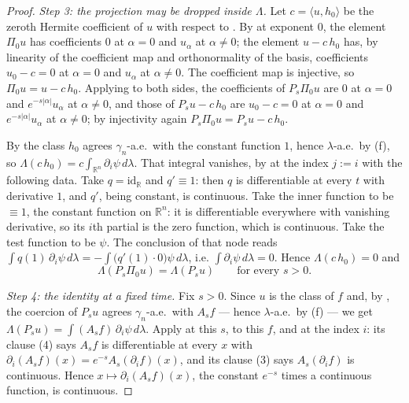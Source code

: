\begin{proof}
\emph{Step 3: the projection may be dropped inside $\Lambda$.}
Let $c = \langle u, h_0\rangle$ be the zeroth Hermite coefficient of $u$ with
respect to .  By  at exponent $0$, the
element $\Pi_0u$ has coefficients $0$ at $\alpha = 0$ and $u_\alpha$ at
$\alpha \neq 0$; the element $u - c\,h_0$ has, by linearity of the coefficient
map and orthonormality of the basis, coefficients $u_0 - c = 0$ at $\alpha = 0$
and $u_\alpha$ at $\alpha \neq 0$.  The coefficient map is injective, so
$\Pi_0 u = u - c\,h_0$.  Applying  to both sides,
the coefficients of $P_s\Pi_0u$ are $0$ at $\alpha = 0$ and
$e^{-s|\alpha|}u_\alpha$ at $\alpha \neq 0$, and those of $P_su - c\,h_0$ are
$u_0 - c = 0$ at $\alpha = 0$ and $e^{-s|\alpha|}u_\alpha$ at $\alpha \neq 0$; by
injectivity again $P_s\Pi_0 u = P_s u - c\,h_0$.

By  the class $h_0$ agrees $\gamma_n$-a.e.\ with the
constant function $1$, hence $\lambda$-a.e.\ by (f), so
$\Lambda(c\,h_0) = c\int_{\mathbb{R}^n}\partial_i\psi\,d\lambda$.  That integral
vanishes, by  at the index $j := i$ with the
following data.  Take $q = \mathrm{id}_{\mathbb{R}}$ and $q' \equiv 1$: then $q$
is differentiable at every $t$ with derivative $1$, and $q'$, being constant, is
continuous.  Take the inner function to be $\equiv 1$, the constant function on
$\mathbb{R}^n$: it is differentiable everywhere with vanishing derivative, so its
$i$th partial is the zero function, which is continuous.  Take the test function
to be $\psi$.  The conclusion of that node reads
$\int q(1)\,\partial_i\psi\,d\lambda
  = -\int \bigl(q'(1)\cdot 0\bigr)\psi\,d\lambda$, i.e.
$\int\partial_i\psi\,d\lambda = 0$.  Hence $\Lambda(c\,h_0) = 0$ and
\begin{equation*}
  \Lambda(P_s\Pi_0u) = \Lambda(P_su) \qquad\text{for every } s>0. \tag{2}
\end{equation*}

\emph{Step 4: the identity at a fixed time.}
Fix $s > 0$.  Since $u$ is the class of $f$ and, by ,
the coercion of $P_su$ agrees $\gamma_n$-a.e.\ with $A_sf$ --- hence
$\lambda$-a.e.\ by (f) --- we get
$\Lambda(P_su) = \int (A_sf)\,\partial_i\psi\,d\lambda$.  Apply
 at this $s$, to this $f$, and at the index
$i$: its clause (4) says $A_sf$ is differentiable at every $x$ with
$\partial_i(A_sf)(x) = e^{-s}A_s(\partial_i f)(x)$, and its clause (3) says
$A_s(\partial_i f)$ is continuous.  Hence $x \mapsto \partial_i(A_sf)(x)$, the
constant $e^{-s}$ times a continuous function, is continuous.


\end{proof}
